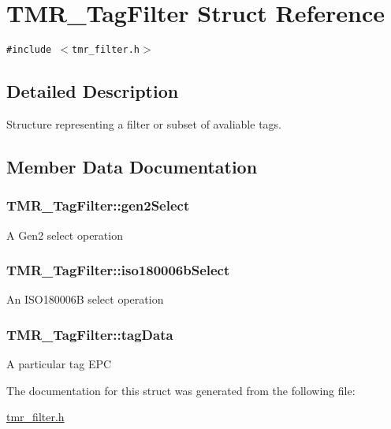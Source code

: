 \hypertarget{struct_t_m_r___tag_filter}{
\section{TMR\_\-TagFilter Struct Reference}
\label{struct_t_m_r___tag_filter}
}
{\tt \#include $<$tmr\_\-filter.h$>$}



\subsection{Detailed Description}
Structure representing a filter or subset of avaliable tags. 

\subsection{Member Data Documentation}
\hypertarget{struct_t_m_r___tag_filter_c807655c10b20fd6291e3637baff66e1}{
\subsubsection[{gen2Select}]{ {\bf TMR\_\-TagFilter::gen2Select}}}
\label{struct_t_m_r___tag_filter_c807655c10b20fd6291e3637baff66e1}


A Gen2 select operation \hypertarget{struct_t_m_r___tag_filter_4fd704fe073f78ec17f195edd9406999}{
\subsubsection[{iso180006bSelect}]{ {\bf TMR\_\-TagFilter::iso180006bSelect}}}
\label{struct_t_m_r___tag_filter_4fd704fe073f78ec17f195edd9406999}


An ISO180006B select operation \hypertarget{struct_t_m_r___tag_filter_6dac74ff2b74df44146e83bb205e66fb}{
\subsubsection[{tagData}]{ {\bf TMR\_\-TagFilter::tagData}}}
\label{struct_t_m_r___tag_filter_6dac74ff2b74df44146e83bb205e66fb}


A particular tag EPC 

The documentation for this struct was generated from the following file:\begin{CompactItemize}
\item 
\hyperlink{tmr__filter_8h}{tmr\_\-filter.h}\end{CompactItemize}
